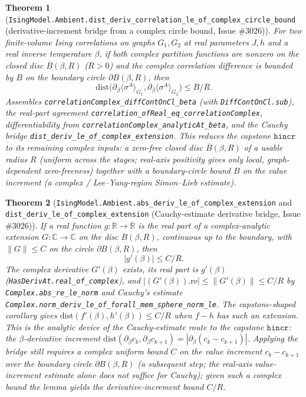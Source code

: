 \documentclass[a4paper,11pt]{article}
\newtheorem{theorem}{Theorem}
\begin{document}
\begin{theorem}[\texttt{IsingModel.Ambient.dist\_deriv\_correlation\_le\_of\_complex\_circle\_bound}
(derivative-increment bridge from a complex circle bound, Issue \#3026)]
For two finite-volume Ising correlations on graphs $G_1,G_2$ at real parameters $J,h$ and a
real inverse temperature $\beta$, if both complex partition functions are nonzero on the
closed disc $\overline{B}(\beta,R)$ ($R>0$) and the complex correlation difference is bounded
by $B$ on the boundary circle $\partial B(\beta,R)$, then
\[
  \mathrm{dist}\bigl(\partial_\beta\langle\sigma^A\rangle_{G_1},
    \partial_\beta\langle\sigma^A\rangle_{G_2}\bigr) \le B/R.
\]
Assembles \texttt{correlationComplex\_diffContOnCl\_beta} (with \texttt{DiffContOnCl.sub}),
the real-part agreement \texttt{correlation\_ofReal\_eq\_correlationComplex},
differentiability from \texttt{correlationComplex\_analyticAt\_beta}, and the Cauchy bridge
\texttt{dist\_deriv\_le\_of\_complex\_extension}. This reduces the capstone $\mathtt{hincr}$
to its remaining \emph{complex} inputs: a zero-free closed disc $\overline{B}(\beta,R)$ of a
usable radius $R$ (uniform across the stages; real-axis positivity gives only local,
graph-dependent zero-freeness) together with a boundary-circle bound $B$ on the value
increment (a complex / Lee--Yang-region Simon--Lieb estimate).
\end{theorem}

\begin{theorem}[\texttt{IsingModel.Ambient.abs\_deriv\_le\_of\_complex\_extension} and
\texttt{dist\_deriv\_le\_of\_complex\_extension} (Cauchy-estimate derivative bridge, Issue \#3026)]
If a real function $g:\mathbb{R}\to\mathbb{R}$ is the real part of a complex-analytic
extension $G:\mathbb{C}\to\mathbb{C}$ on the disc $B(\beta,R)$, continuous up to the
boundary, with $\|G\|\le C$ on the circle $\partial B(\beta,R)$, then
\[
  |g'(\beta)| \le C/R.
\]
The complex derivative $G'(\beta)$ exists, its real part is $g'(\beta)$
(\texttt{HasDerivAt.real\_of\_complex}), and $|(G'(\beta)).\mathrm{re}|\le\|G'(\beta)\|\le
C/R$ by \texttt{Complex.abs\_re\_le\_norm} and Cauchy's estimate
\texttt{Complex.norm\_deriv\_le\_of\_forall\_mem\_sphere\_norm\_le}. The capstone-shaped
corollary gives $\mathrm{dist}(f'(\beta),h'(\beta))\le C/R$ when $f-h$ has such an
extension. This is the analytic device of the \emph{Cauchy-estimate route} to the
capstone $\mathtt{hincr}$: the $\beta$-derivative increment
$\mathrm{dist}(\partial_\beta c_k,\partial_\beta c_{k+1})=|\partial_\beta(c_k-c_{k+1})|$.
Applying the bridge still requires a \emph{complex} uniform bound $C$ on the value
increment $c_k-c_{k+1}$ over the boundary circle $\partial B(\beta,R)$ (a subsequent step;
the real-axis value-increment estimate alone does not suffice for Cauchy); given such a
complex bound the lemma yields the \emph{derivative}-increment bound $C/R$.
\end{theorem}
\end{document}
